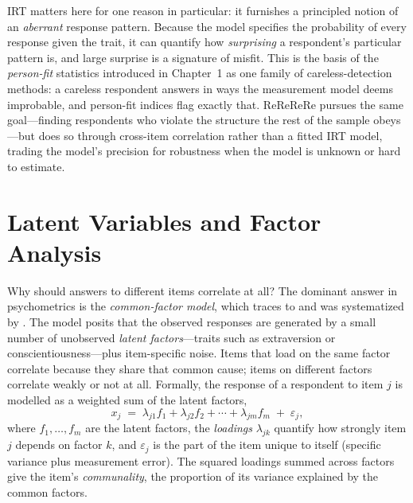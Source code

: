 IRT matters here for one reason in particular: it furnishes a principled notion
of an \emph{aberrant} response pattern. Because the model specifies the
probability of every response given the trait, it can quantify how
\emph{surprising} a respondent's particular pattern is, and large surprise is a
signature of misfit. This is the basis of the \emph{person-fit} statistics
\parencite{meijer2001methodology} introduced in Chapter~1 as one family of
careless-detection methods: a careless respondent answers in ways the
measurement model deems improbable, and person-fit indices flag exactly that.
ReReReRe pursues the same goal---finding respondents who violate the structure
the rest of the sample obeys---but does so through cross-item correlation rather
than a fitted IRT model, trading the model's precision for robustness when the
model is unknown or hard to estimate.

\section{Latent Variables and Factor Analysis}
\label{sec:efa}

Why should answers to different items correlate at all? The dominant answer in
psychometrics is the \emph{common-factor model}, which traces to
\textcite{spearman1904general} and was systematized by
\textcite{thurstone1947multiple}. The model posits that the observed responses
are generated by a small number of unobserved \emph{latent factors}---traits
such as extraversion or conscientiousness---plus item-specific noise. Items that
load on the same factor correlate because they share that common cause; items on
different factors correlate weakly or not at all. Formally, the response of a
respondent to item $j$ is modelled as a weighted sum of the latent factors,
\begin{equation}
x_j \;=\; \lambda_{j1} f_1 + \lambda_{j2} f_2 + \cdots + \lambda_{jm} f_m
\;+\; \varepsilon_j ,
\label{eq:cfa}
\end{equation}
where $f_1,\dots,f_m$ are the latent factors, the \emph{loadings}
$\lambda_{jk}$ quantify how strongly item $j$ depends on factor $k$, and
$\varepsilon_j$ is the part of the item unique to itself (specific variance plus
measurement error). The squared loadings summed across factors give the item's
\emph{communality}, the proportion of its variance explained by the common
factors.

